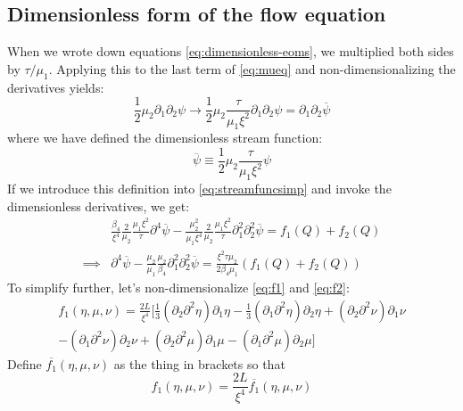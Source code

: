 \documentclass[reqno]{article}
\begin{document}
	\subsection{Dimensionless form of the flow equation}
	When we wrote down equations \eqref{eq:dimensionless-eoms}, we multiplied both sides by $\tau/\mu_1$. Applying this to the last term of \eqref{eq:mueq} and non-dimensionalizing the derivatives yields:
	\begin{equation}
		\frac{1}{2} \mu_2 \partial_1 \partial_2 \psi \to \frac{1}{2} \mu_2 \frac{\tau}{\mu_1 \xi^2} \partial_1 \partial_2 \psi = \partial_1 \partial_2 \overline{\psi}
	\end{equation}
	where we have defined the dimensionless stream function:
	\begin{equation}
		\overline{\psi} \equiv \frac12 \mu_2 \frac{\tau}{\mu_1 \xi^2} \psi
	\end{equation}
	If we introduce this definition into \eqref{eq:streamfuncsimp} and invoke the dimensionless derivatives, we get:
	\begin{equation}
	\begin{split}
		&\frac{\beta_4}{\xi^4} \frac{2}{\mu_2} \frac{\mu_1 \xi^2}{\tau} \partial^4 \overline{\psi}
		- \frac{\mu_2^2}{\mu_1 \xi^4} \frac{2}{\mu_2} \frac{\mu_1 \xi^2}{\tau} \partial_1^2 \partial_2^2 \overline{\psi}
		= f_1(Q) + f_2(Q) \\
		\implies &\partial^4 \overline{\psi}
		- \frac{\mu_2}{\mu_1} \frac{\mu_2}{\beta_4} \partial_1^2 \partial_2^2 \overline{\psi}
		= 
		\frac{\xi^2 \tau \mu_2}{2\beta_4 \mu_1} \left( f_1(Q) + f_2(Q) \right)
	\end{split}
	\end{equation}
	To simplify further, let's non-dimensionalize \eqref{eq:f1} and \eqref{eq:f2}:
	\begin{multline}
		f_1(\eta, \mu, \nu) = \frac{2L}{\xi^4} \bigg[ \tfrac13 \left( \partial_2\partial^2 \eta \right) \partial_1 \eta - \tfrac13 \left( \partial_1\partial^2 \eta\right)\partial_2 \eta + \left(\partial_2 \partial^2 \nu\right)\partial_1 \nu \\ - \left(\partial_1 \partial^2 \nu\right)\partial_2 \nu + \left(\partial_2 \partial^2 \mu\right)\partial_1 \mu - \left(\partial_1 \partial^2 \mu\right)\partial_2 \mu \bigg]
	\end{multline}
	Define $\overline{f_1}(\eta, \mu, \nu)$ as the thing in brackets so that
	\begin{equation}
		f_1(\eta, \mu, \nu) = \frac{2L}{\xi^4} \overline{f_1}(\eta, \mu, \nu)
	\end{equation}
\end{document}
